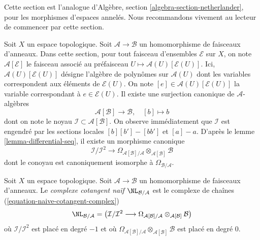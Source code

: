 \noindent
Cette section est l'analogue d'Algèbre, section
\ref{algebra-section-netherlander}, pour les morphismes d'espaces annelés.
Nous recommandons vivement au lecteur de commencer par cette section.

\medskip\noindent
Soit $X$ un espace topologique. Soit $\mathcal{A} \to \mathcal{B}$ un
homomorphisme de faisceaux d'anneaux. Dans cette section, pour tout faisceau
d'ensembles $\mathcal{E}$ sur $X$, on note $\mathcal{A}[\mathcal{E}]$ le
faisceau associé au préfaisceau
$U \mapsto \mathcal{A}(U)[\mathcal{E}(U)]$. Ici,
$\mathcal{A}(U)[\mathcal{E}(U)]$
désigne l'algèbre de polynômes sur $\mathcal{A}(U)$ dont les variables
correspondent aux éléments de $\mathcal{E}(U)$. On note
$[e] \in \mathcal{A}(U)[\mathcal{E}(U)]$ la variable correspondant à
$e \in \mathcal{E}(U)$. Il existe une surjection canonique de
$\mathcal{A}$-algèbres
\begin{equation}
\label{equation-canonical-presentation}
\mathcal{A}[\mathcal{B}] \longrightarrow \mathcal{B},\quad [b] \longmapsto b
\end{equation}
dont on note le noyau $\mathcal{I} \subset \mathcal{A}[\mathcal{B}]$.
On observe immédiatement que $\mathcal{I}$ est engendré par les sections
locales $[b][b'] - [bb']$ et $[a] - a$. D'après le lemme
\ref{lemma-differential-seq}, il existe un morphisme canonique
\begin{equation}
\label{equation-naive-cotangent-complex}
\mathcal{I}/\mathcal{I}^2
\longrightarrow
\Omega_{\mathcal{A}[\mathcal{B}]/\mathcal{A}}
\otimes_{\mathcal{A}[\mathcal{B}]} \mathcal{B}
\end{equation}
dont le conoyau est canoniquement isomorphe à
$\Omega_{\mathcal{B}/\mathcal{A}}$.

\begin{definition}
\label{definition-naive-cotangent-complex}
Soit $X$ un espace topologique. Soit $\mathcal{A} \to \mathcal{B}$ un
homomorphisme de faisceaux d'anneaux. Le
{\it complexe cotangent naïf} $\NL_{\mathcal{B}/\mathcal{A}}$ est le
complexe de chaînes
(\ref{equation-naive-cotangent-complex})
$$
\NL_{\mathcal{B}/\mathcal{A}} =
\left(\mathcal{I}/\mathcal{I}^2
\longrightarrow
\Omega_{\mathcal{A}[\mathcal{B}]/\mathcal{A}}
\otimes_{\mathcal{A}[\mathcal{B}]} \mathcal{B}\right)
$$
où $\mathcal{I}/\mathcal{I}^2$ est placé en degré $-1$ et où
$\Omega_{\mathcal{A}[\mathcal{B}]/\mathcal{A}}
\otimes_{\mathcal{A}[\mathcal{B}]} \mathcal{B}$
est placé en degré $0$.
\end{definition}

